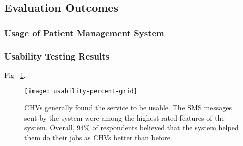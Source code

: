 \subsection{Evaluation Outcomes}
\subsubsection{Usage of Patient Management System}

\subsubsection{Usability Testing Results}
Fig ~\ref{fig:barchart}.
\begin{figure}[h]
	\begin{center}
	\texttt{[image: usability-percent-grid]}
	\end{center}
	\caption{CHVs generally found the service to be usable. The SMS messages sent by the system were among the highest rated features of the system. Overall, 94\% of respondents believed that the system helped them do their jobs as CHVs better than before.}
	\label{fig:barchart}
\end{figure}

